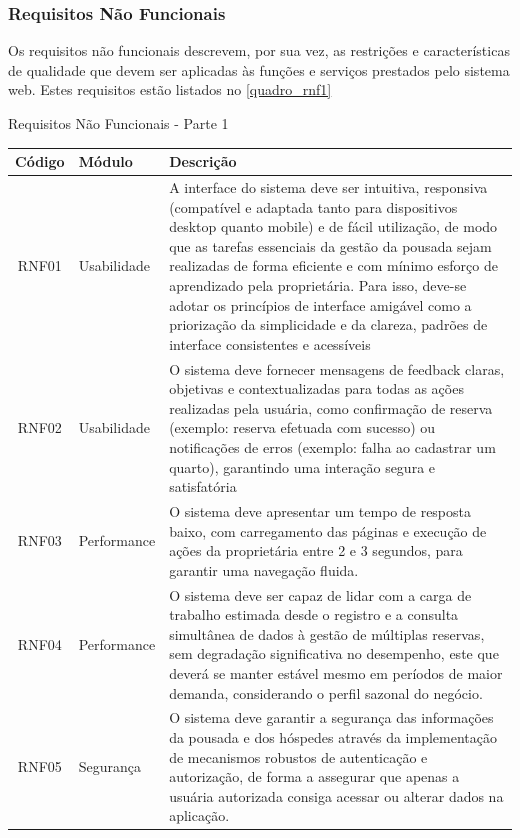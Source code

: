 \documentclass[
	12pt,				%
	openany,			%
	twoside,			%
	a4paper,			%
	english,			%
	french,				%
	spanish,			%
	brazil				%
	]{abntex2}
\begin{document}
\subsubsection{Requisitos Não Funcionais}
Os requisitos não funcionais descrevem, por sua vez, as restrições e características de qualidade que devem ser aplicadas às funções e serviços prestados pelo sistema web. Estes requisitos estão listados no \autoref{quadro_rnf1}
\begin{quadro}[H]
	\caption{\label{quadro_rnf1}Requisitos Não Funcionais - Parte 1}
	\begin{tabular}{|c|p{4cm}|p{8cm}|}
		\hline
		\textbf{Código} & \textbf{Módulo} & \textbf{Descrição} \\ \hline
		RNF01 & Usabilidade & A interface do sistema deve ser intuitiva, responsiva (compatível e adaptada tanto para dispositivos desktop quanto mobile)  e de fácil utilização, de modo que as tarefas essenciais da gestão da pousada sejam realizadas de forma eficiente e com mínimo esforço de aprendizado pela proprietária.  Para isso, deve-se adotar os princípios de interface amigável como a priorização da simplicidade e da clareza, padrões de interface consistentes e acessíveis
		 \\ \hline
		RNF02 & Usabilidade & O sistema deve fornecer mensagens de feedback claras, objetivas e contextualizadas para  todas as ações  realizadas pela usuária, como confirmação de reserva (exemplo: reserva efetuada com sucesso) ou notificações de erros (exemplo: falha ao cadastrar um quarto), garantindo uma interação segura e  satisfatória \\ \hline
		RNF03 & Performance & O sistema deve apresentar um tempo de resposta baixo, com carregamento das páginas e execução de ações da proprietária entre 2 e 3 segundos, para garantir uma navegação fluida. \\ \hline
		RNF04 & Performance & O sistema deve ser capaz de lidar com a carga de trabalho estimada desde o registro e a consulta simultânea de dados à gestão de múltiplas reservas, sem degradação significativa no desempenho, este que deverá se manter estável mesmo em períodos de maior demanda, considerando o perfil sazonal do negócio. \\ \hline
		RNF05 & Segurança & O sistema deve garantir a segurança das informações da pousada e dos hóspedes através da implementação de mecanismos robustos de autenticação e autorização, de forma a assegurar que apenas a usuária autorizada consiga acessar ou alterar dados na aplicação. \\ \hline
	
	\end{tabular}
\end{quadro}
\end{document}
